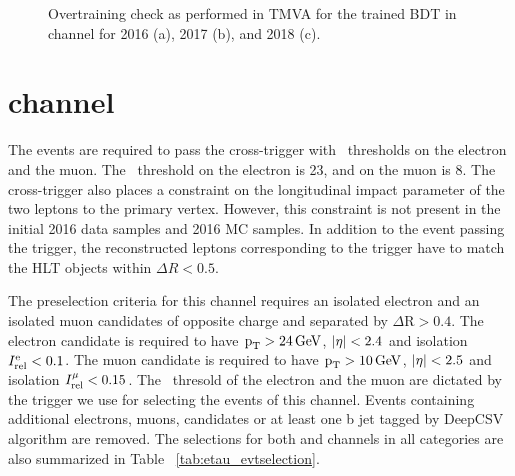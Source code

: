 \begin{figure}[htbp]
  \centering
  \caption{Overtraining check as performed in TMVA for the trained BDT in \Hehad channel for 2016 (a), 2017 (b), and 2018 (c).}
  \label{fig:etauh_bdttrain}
\end{figure}



\section{\texorpdfstring{\Hemu}{Hetaumu} channel}
The events are required to pass the cross-trigger with \pt\, thresholds on the electron and the muon. The \pt\, threshold on the electron is 23\GeV, and on the muon is 8\GeV. The cross-trigger also places a constraint on the longitudinal impact parameter of the two leptons to the primary vertex. However, this constraint is not present in the initial 2016 data samples and 2016 MC samples. In addition to the event passing the trigger, the reconstructed leptons corresponding to the trigger have to match the HLT objects within $\Delta R < 0.5$.

The preselection criteria for this channel requires an isolated electron and an isolated muon candidates of opposite charge and separated by $\Delta\text{R} > 0.4$. The electron candidate is required to have $\text{p}_\text{T} > 24\,\text{Ge\hspace{-.08em}V}$, $\lvert\eta\rvert < 2.4$ and isolation $I^{\text{e}}_\text{rel} < 0.1$. The muon candidate is required to have $\text{p}_\text{T} > 10\,\text{Ge\hspace{-.08em}V}$, $\lvert\eta\rvert < 2.5$ and isolation $I^{\mu}_\text{rel} < 0.15$. The \pt\, thresold of the electron and the muon are dictated by the trigger we use for selecting the events of this channel. Events containing additional electrons, muons, \tauh candidates or at least one b jet tagged by DeepCSV algorithm are removed. The selections for both \Hehad and \Hemu channels in all categories are also summarized in Table ~\ref{tab:etau_evtselection}.

